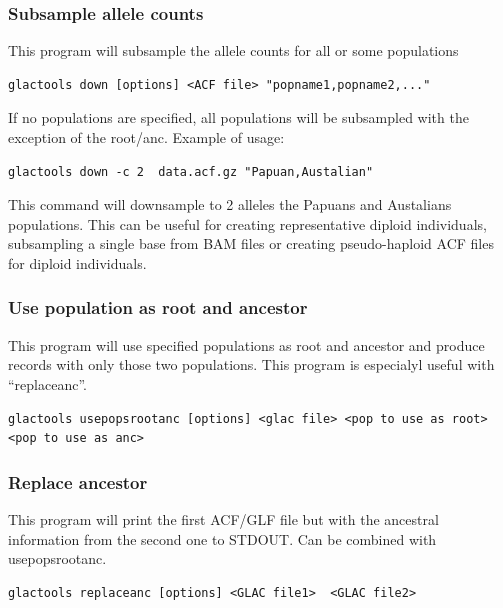 \documentclass[a4paper]{article}
\begin{document}
\subsubsection{Subsample allele counts}

\noindent This program will subsample the allele counts for all or some populations

\small
\begin{lstlisting}
glactools down [options] <ACF file> "popname1,popname2,..." 
\end{lstlisting}
\normalsize


\noindent If no populations are specified, all populations will be subsampled with the exception of the root/anc. Example of usage:

\begin{lstlisting}
glactools down -c 2  data.acf.gz "Papuan,Austalian" 
\end{lstlisting}

\noindent This command will downsample to 2 alleles the Papuans and Austalians populations. This can be useful for creating representative diploid individuals, subsampling a single base from BAM files or creating pseudo-haploid ACF files for diploid individuals. 


\subsubsection{Use population as root and ancestor}

\noindent This program will use specified populations as root and ancestor and produce records with only those two populations. This program is especialyl useful with ``replaceanc''.

\begin{lstlisting}
glactools usepopsrootanc [options] <glac file> <pop to use as root> <pop to use as anc>
\end{lstlisting}


\subsubsection{Replace ancestor}

\noindent This program will print the first ACF/GLF file but with the ancestral information from the second one to STDOUT. Can be combined with usepopsrootanc.

\begin{lstlisting}
glactools replaceanc [options] <GLAC file1>  <GLAC file2>
\end{lstlisting}
\end{document}
